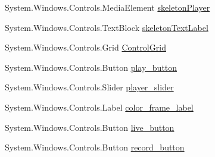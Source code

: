 \begin{DoxyCompactItemize}
\item 
System.\-Windows.\-Controls.\-Media\-Element \hyperlink{classUTKinectSkeletonMovementDetector_1_1MainWindow_aa8a284293965f2d8be2528f6ddce07fe}{skeleton\-Player}
\item 
System.\-Windows.\-Controls.\-Text\-Block \hyperlink{classUTKinectSkeletonMovementDetector_1_1MainWindow_a7a273638d2c547d01be972e5702b1f56}{skeleton\-Text\-Label}
\item 
System.\-Windows.\-Controls.\-Grid \hyperlink{classUTKinectSkeletonMovementDetector_1_1MainWindow_aca06038d8f63f2455d1c3a46cdc3f7c0}{Control\-Grid}
\item 
System.\-Windows.\-Controls.\-Button \hyperlink{classUTKinectSkeletonMovementDetector_1_1MainWindow_a86efef4c2a91bce24ea78034fc88ea53}{play\-\_\-button}
\item 
System.\-Windows.\-Controls.\-Slider \hyperlink{classUTKinectSkeletonMovementDetector_1_1MainWindow_a42e53b8dc19d2580b663b5cd9f2717e2}{player\-\_\-slider}
\item 
System.\-Windows.\-Controls.\-Label \hyperlink{classUTKinectSkeletonMovementDetector_1_1MainWindow_a27cf6fcd9bff2ca2f1e8407af00413e3}{color\-\_\-frame\-\_\-label}
\item 
System.\-Windows.\-Controls.\-Button \hyperlink{classUTKinectSkeletonMovementDetector_1_1MainWindow_a380c8a74f48341dd20d1e2fb4580faff}{live\-\_\-button}
\item 
System.\-Windows.\-Controls.\-Button \hyperlink{classUTKinectSkeletonMovementDetector_1_1MainWindow_af4f2a4c396ff6eb6f80d8a2f5dc69895}{record\-\_\-button}
\end{DoxyCompactItemize}
